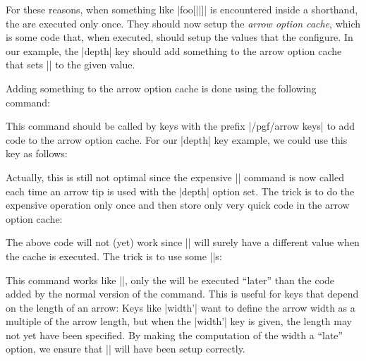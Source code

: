 For these reasons, when something like |foo[||]| is 
encountered inside a shorthand, the  are executed only
once. They should now setup the \emph{arrow option cache}, which is
some code that, when executed, should setup the values that the
 configure. In our example, the |depth| key should add
something to the arrow option cache that sets |\pgfarrowdepth| to the
given value.

Adding something to the arrow option cache is done using the following
command:

\begin{command}{\pgfarrowsaddtooptions{}}
  This command should be called by keys with the prefix
  |/pgf/arrow keys| to add code to the arrow option cache. For our
  |depth| key example, we could use this key as follows:
\begin{codeexample}[code only]
\pgfkeys{/pgf/arrow keys/depth/.code=
  \pgfarrowsaddtooptions{\pgfmathsetlength{\pgfarrowdepth}{#1}}
\end{codeexample}
  Actually, this is still not optimal since the expensive
  |\pgfmathsetlength| command is now called each time an arrow tip is
  used with the |depth| option set. The trick is to do the expensive
  operation only once and then store only very quick code in the arrow
  option cache:
\begin{codeexample}[code only]
\pgfkeys{/pgf/arrow keys/depth/.code=
  \pgfmathsetlength{\somedimen}{#1}
  \pgfarrowsaddtooptions{\pgfarrowdepth=\somedimen} %
\end{codeexample}
  The above code will not (yet) work since |\somedimen| will surely
  have a different value when the cache is executed. The trick is to
  use some |\expandafter|s:
\begin{codeexample}[code only]
\pgfkeys{/pgf/arrow keys/depth/.code=
  \pgfmathsetlength{\somedimen}{#1}
  \expandafter\pgfarrowsaddtooptions\expandafter{\expandafter\pgfarrowdepth\expandafter=\the\somedimen}
\end{codeexample}
\end{command}


\begin{command}{\pgfarrowsaddtolateoptions{}}
  This command works like |\pgfarrowsaddtooptions|, only the
   will be executed ``later'' than the code added by the
  normal version of the command. This is useful for keys that depend
  on the length of an arrow: Keys like |width'| want to define the
  arrow width as a multiple of the arrow length, but when the |width'|
  key is given, the length may not yet have been specified. By making
  the computation of the width a ``late'' option, we ensure that
  |\pgfarrowlength| will have been setup correctly.
\end{command}

